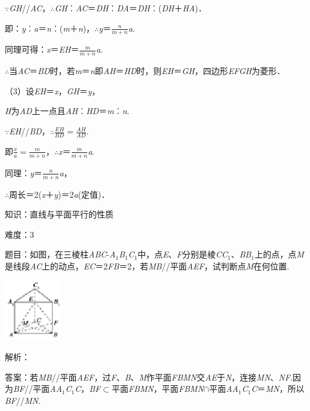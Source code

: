 \documentclass{article} %
\begin{document}
$\mathrm{\because}$\textit{GH}//\textit{AC}，$\mathrm{\therefore}$\textit{GH}︰\textit{AC}＝\textit{DH}︰\textit{DA}＝\textit{DH}︰(\textit{DH}＋\textit{HA})．

即：\textit{y}︰\textit{a}＝\textit{n}︰(\textit{m}＋\textit{n})，$\mathrm{\therefore}$\textit{y}＝$\frac{n}{m+n}$\textit{a}.

同理可得：\textit{x}＝\textit{EH}＝$\frac{m}{m+n}$\textit{a}.

$\mathrm{\therefore}$当\textit{AC}＝\textit{BD}时，若\textit{m}＝\textit{n}即\textit{AH}＝\textit{HD}时，则\textit{EH}＝\textit{GH}，四边形\textit{EFGH}为菱形．

（3）设\textit{EH}＝\textit{x}，\textit{GH}＝\textit{y}，

\textit{H}为\textit{AD}上一点且\textit{AH}︰\textit{HD}＝\textit{m}︰\textit{n}.

$\mathrm{\because}$\textit{EH}//\textit{BD}，$\mathrm{\therefore}\frac{EH}{BD}=\frac{AH}{AD}$.

即$\frac{x}{a}=\frac{m}{m+n}$，$\mathrm{\therefore}$\textit{x}＝$\frac{m}{m+n}$\textit{a}.

同理：\textit{y}＝$\frac{n}{m+n}$\textit{a}，

$\mathrm{\therefore}$周长＝2(\textit{x}＋\textit{y})＝2\textit{a}(定值)．

知识：直线与平面平行的性质

难度：3

题目：如图，在三棱柱\textit{ABC}-\textit{A}${}_{1}$\textit{B}${}_{1}$\textit{C}${}_{1}$中，点\textit{E}、\textit{F}分别是棱\textit{CC}${}_{1}$、\textit{BB}${}_{1}$上的点，点\textit{M}是线段\textit{AC}上的动点，\textit{EC}＝2\textit{FB}＝2，若\textit{MB}//平面\textit{AEF}，试判断点\textit{M}在何位置.

\includegraphics*[width=0.98in, height=1.04in, keepaspectratio=false]{image172}

解析：

答案：若\textit{MB}//平面\textit{AEF}，过\textit{F}、\textit{B}、\textit{M}作平面\textit{FBMN}交\textit{AE}于\textit{N}，连接\textit{MN}、\textit{NF}.因为\textit{BF}//平面\textit{AA}${}_{1}$\textit{C}${}_{1}$\textit{C}，\textit{BF}$\mathrm{\subset }$平面\textit{FBMN}，平面\textit{FBMN}$\mathrm{\cap}$平面\textit{AA}${}_{1}$\textit{C}${}_{1}$\textit{C}＝\textit{MN}，所以\textit{BF}//\textit{MN}.
\end{document}
